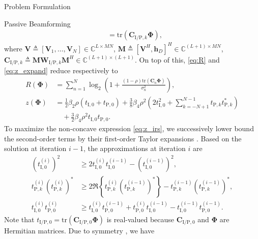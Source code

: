 \documentclass[journal]{IEEEtran}
\begin{document}
\begin{section}{Problem Formulation}
\begin{subsection}{Passive Beamforming}
\begin{align}
				& = \mathrm{tr}(\boldsymbol{C}_{\mathrm{I/P},k}\boldsymbol{\Phi})\label{eq:t_k},
			\end{align}
			where $\boldsymbol{V} \triangleq [\boldsymbol{V}_1,\dots,\boldsymbol{V}_N] \in \mathbb{C}^{L \times MN}$, $\boldsymbol{M} \triangleq [\boldsymbol{V}^H, \boldsymbol{h}_{D}]^H \in \mathbb{C}^{(L+1) \times MN}$, $\boldsymbol{C}_{\mathrm{I/P},k} \triangleq \boldsymbol{M}\boldsymbol{W}_{\mathrm{I/P},k}\boldsymbol{M}^H \in \mathbb{C}^{(L+1)\times(L+1)}$. On top of this, \eqref{eq:R} and \eqref{eq:z_expand} reduce respectively to
			\begin{align}
				R(\boldsymbol{\Phi})
				& = \sum_{n=1}^{N}{\log_2\left(1+\frac{(1-\rho)\mathrm{tr}(\boldsymbol{C}_n\boldsymbol{\Phi})}{\sigma_n^2}\right)},\label{eq:R_irs}\\
				z(\boldsymbol{\Phi})
				& = \frac{1}{2}{\beta_2}{\rho}(t_{\mathrm{I},0}+t_{\mathrm{P},0}) + \frac{3}{8}{\beta_4}{\rho^2} \left(2t_{\mathrm{I},0}^2 + \sum_{k=-N+1}^{N-1}{t_{\mathrm{P},k}t_{\mathrm{P},k}^*}\right)\nonumber\\
				& \quad + \frac{3}{2}{\beta_4}{\rho^2}t_{\mathrm{I},0}t_{\mathrm{P},0}.\label{eq:z_irs}
			\end{align}
			To maximize the non-concave expression \eqref{eq:z_irs}, we successively lower bound the second-order terms by their first-order Taylor expansions \cite{Adali2010}. Based on the solution at iteration $i - 1$, the approximations at iteration $i$ are
			\begin{align}
				(t_{\mathrm{I},0}^{(i)})^2
				& \ge 2 t_{\mathrm{I},0}^{(i)}t_{\mathrm{I},0}^{(i-1)} - (t_{\mathrm{I},0}^{(i-1)})^2,\label{eq:taylor_1}\\
				t_{\mathrm{P},k}^{(i)} (t_{\mathrm{P},k}^{(i)})^*
				& \ge 2 \Re\left\{t_{\mathrm{P},k}^{(i)} (t_{\mathrm{P},k}^{(i-1)})^*\right\} - t_{\mathrm{P},k}^{(i-1)} (t_{\mathrm{P},k}^{(i-1)})^*,\label{eq:taylor_2}\\
				t_{\mathrm{I},0}^{(i)} t_{\mathrm{P},0}^{(i)}
				& \ge t_{\mathrm{I},0}^{(i)} t_{\mathrm{P},0}^{(i-1)} + t_{\mathrm{P},0}^{(i)} t_{\mathrm{I},0}^{(i-1)} - t_{\mathrm{I},0}^{(i-1)} t_{\mathrm{P},0}^{(i-1)}.\label{eq:taylor_3}
			\end{align}
			Note that $t_{\mathrm{I/P},0}=\mathrm{tr}(\boldsymbol{C}_{\mathrm{I/P},0}\boldsymbol{\Phi})$ is real-valued because $\boldsymbol{C}_{\mathrm{I/P},0}$ and $\boldsymbol{\Phi}$ are Hermitian matrices. Due to symmetry \cite{Golub2013}, we have
			\begin{equation}\label{eq:coupled_terms}

\end{equation}
\end{subsection}
\end{section}
\end{document}
